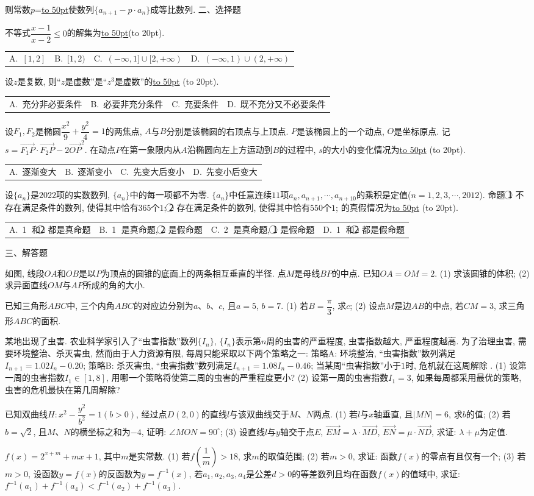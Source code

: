 \documentclass[10pt,a4paper]{article}
\newcommand{\blank}[1]{\underline{\hbox to #1pt{}}}
\newcommand{\bracket}[1]{(\hbox to #1pt{})}
\newcommand{\fourch}[4]{\par\begin{tabular}{p{.23\textwidth}p{.23\textwidth}p{.23\textwidth}p{.23\textwidth}}
A.~#1 &B.~#2& C.~#3& D.~#4
\end{tabular}}
\begin{document}
则常数$p$=\blank{50}使数列$\{a_{n+1}-p\cdot a_n\}$成等比数列.
二、选择题
\item 不等式$\dfrac{x-1}{x-2}\le 0$的解集为\blank{50}\bracket{20}.
\fourch{$[1,2]$}{$[1,2)$}{$(-\infty,1]\cup [2,+\infty)$}{$(-\infty,1)\cup (2,+\infty)$}
\item 设$z$是复数, 则``$z$是虚数''是``$z^3$是虚数''的\blank{50}		 \bracket{20}.
\fourch{充分非必要条件}{必要非充分条件}{充要条件}{既不充分又不必要条件}
\item 设$F_1,F_2$是椭圆$\dfrac{x^2}9+\dfrac{y^2}4=1$的两焦点, $A$与$B$分别是该椭圆的右顶点与上顶点. $P$是该椭圆上的一个动点, $O$是坐标原点. 记$s=\overrightarrow{F_1P}\cdot \overrightarrow{F_2P}-2\overrightarrow{OP}^2$. 在动点$P$在第一象限内从$A$沿椭圆向左上方运动到$B$的过程中, $s$的大小的变化情况为\blank{50}									 \bracket{20}.
\fourch{逐渐变大}{逐渐变小}{先变大后变小}{先变小后变大}
\item 设$\{a_n\}$是$2022$项的实数数列, $\{a_n\}$中的每一项都不为零. $\{a_n\}$中任意连续$11$项$a_n,a_{n+1},\cdots ,a_{n+10}$的乘积是定值($n=1,2,3,\cdots ,2012$). 命题
\textcircled{1}  不存在满足条件的数列, 使得其中恰有$365$个$1$;
\textcircled{2}  存在满足条件的数列, 使得其中恰有$550$个$1$;
的真假情况为\blank{50}	\bracket{20}.
\fourch{\textcircled{1} 和\textcircled{2} 都是真命题}{\textcircled{1} 是真命题, \textcircled{2} 是假命题}{\textcircled{2} 是真命题, \textcircled{1} 是假命题}{\textcircled{1} 和\textcircled{2} 都是假命题}
三、解答题
\item 如图, 线段$OA$和$OB$是以$P$为顶点的圆锥的底面上的两条相互垂直的半径. 点$M$是母线$BP$的中点. 已知$OA=OM=2$.
(1) 求该圆锥的体积;
(2) 求异面直线$OM$与$AP$所成的角的大小.
\item 已知三角形$ABC$中, 三个内角$ABC$的对应边分别为$a$、$b$、$c$, 且$a=5$, $b=7$.
(1) 若$B=\dfrac{\pi }3$, 求$c$;
(2) 设点$M$是边$AB$的中点, 若$CM=3$, 求三角形$ABC$的面积.
\item 某地出现了虫害. 农业科学家引入了``虫害指数''数列$\{I_n\}$, $\{I_n\}$表示第$n$周的虫害的严重程度, 虫害指数越大, 严重程度越高. 为了治理虫害, 需要环境整治、杀灭害虫, 然而由于人力资源有限, 每周只能采取以下两个策略之一:
策略A: 环境整治, ``虫害指数''数列满足$I_{n+1}=1.02I_n-0.20$;
策略B: 杀灭害虫, ``虫害指数''数列满足$I_{n+1}=1.08I_n-0.46$;
当某周``虫害指数''小于$1$时, 危机就在这周解除 .
(1) 设第一周的虫害指数$I_1\in [1,8]$, 用哪一个策略将使第二周的虫害的严重程度更小?
(2) 设第一周的虫害指数$I_1=3$, 如果每周都采用最优的策略, 虫害的危机最快在第几周解除?
\item 已知双曲线$H:x^2-\dfrac{y^2}{b^2}=1(b>0)$, 经过点$D(2,0)$的直线$l$与该双曲线交于$M$、$N$两点.
(1) 若$l$与$x$轴垂直, 且$|MN|=6$, 求$b$的值;
(2) 若$b=\sqrt 2$, 且$M$、$N$的横坐标之和为$-4$, 证明: $\angle MON=90^\circ$;
(3) 设直线$l$与$y$轴交于点$E$, $\overrightarrow{EM}=\lambda \cdot \overrightarrow{MD}$, $\overrightarrow{EN}=\mu \cdot \overrightarrow{ND}$, 求证: $\lambda +\mu$为定值.
\item $f(x)=2^{x+m}+m x+1$, 其中$m$是实常数.
(1) 若$f(\dfrac 1m)>18$, 求$m$的取值范围;
(2) 若$m>0$, 求证: 函数$f(x)$的零点有且仅有一个;
(3) 若$m>0$, 设函数$y=f(x)$的反函数为$y=f^{-1}(x)$, 若$a_1,a_2,a_3,a_4$是公差$d>0$的等差数列且均在函数$f(x)$的值域中, 求证: $f^{-1}(a_1)+f^{-1}(a_4)<f^{-1}(a_2)+f^{-1}(a_3)$.
\end{document}
